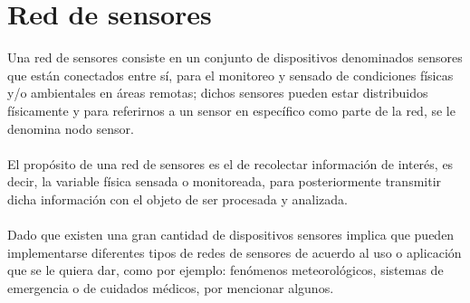 \section{Red de sensores}
Una red de sensores consiste en un conjunto de dispositivos denominados sensores que están conectados entre sí, para el monitoreo y sensado de condiciones físicas y/o ambientales en áreas remotas; dichos sensores pueden estar distribuidos físicamente y para referirnos a un sensor en específico como parte de la red, se le denomina nodo sensor. 
\paragraph{}
El propósito de una red de sensores es el de recolectar información de interés, es decir, la variable física sensada o monitoreada, para posteriormente transmitir dicha información con el objeto de ser procesada y analizada. 
\paragraph{}
Dado que existen una gran cantidad de dispositivos sensores implica que pueden implementarse diferentes tipos de redes de sensores de acuerdo al uso o aplicación que se le quiera dar, como por ejemplo: fenómenos meteorológicos, sistemas de emergencia o de cuidados médicos, por mencionar algunos.\citep{MarcoTeorico16}

